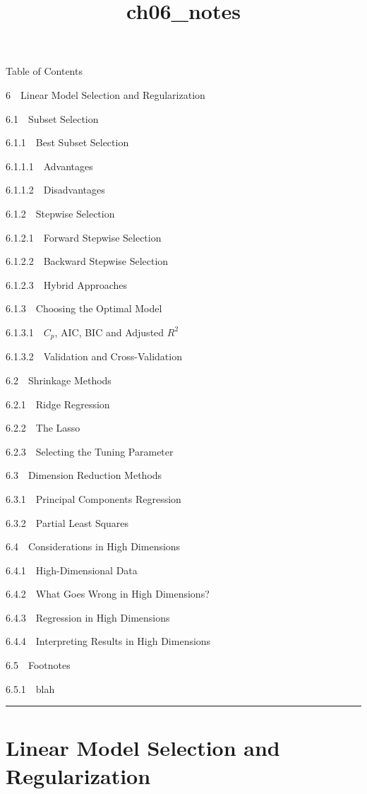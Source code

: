 \documentclass[11pt]{article}
\title{ch06\_notes}
\begin{document}
    
    
    \maketitle
    
    

    
    Table of Contents{}

{{6~~}Linear Model Selection and Regularization}

{{6.1~~}Subset Selection}

{{6.1.1~~}Best Subset Selection}

{{6.1.1.1~~}Advantages}

{{6.1.1.2~~}Disadvantages}

{{6.1.2~~}Stepwise Selection}

{{6.1.2.1~~}Forward Stepwise Selection}

{{6.1.2.2~~}Backward Stepwise Selection}

{{6.1.2.3~~}Hybrid Approaches}

{{6.1.3~~}Choosing the Optimal Model}

{{6.1.3.1~~}\(C_p\), AIC, BIC and Adjusted \(R^2\)}

{{6.1.3.2~~}Validation and Cross-Validation}

{{6.2~~}Shrinkage Methods}

{{6.2.1~~}Ridge Regression}

{{6.2.2~~}The Lasso}

{{6.2.3~~}Selecting the Tuning Parameter}

{{6.3~~}Dimension Reduction Methods}

{{6.3.1~~}Principal Components Regression}

{{6.3.2~~}Partial Least Squares}

{{6.4~~}Considerations in High Dimensions}

{{6.4.1~~}High-Dimensional Data}

{{6.4.2~~}What Goes Wrong in High Dimensions?}

{{6.4.3~~}Regression in High Dimensions}

{{6.4.4~~}Interpreting Results in High Dimensions}

{{6.5~~}Footnotes}

{{6.5.1~~}blah}

    \begin{center}\rule{0.5\linewidth}{\linethickness}\end{center}

\hypertarget{linear-model-selection-and-regularization}{%
\section{Linear Model Selection and
Regularization}\label{linear-model-selection-and-regularization}}
\end{document}
